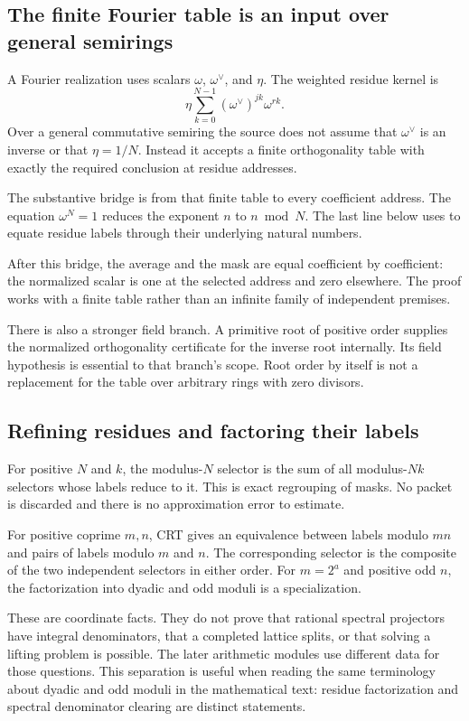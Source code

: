 \subsection{The finite Fourier table is an input over general semirings}

A Fourier realization uses scalars $\omega$, $\omega^\vee$, and $\eta$. The weighted residue kernel is
\[
\eta\sum_{k=0}^{N-1}(\omega^\vee)^{jk}\omega^{rk}.
\]
Over a general commutative semiring the source does not assume that $\omega^\vee$ is an inverse or that $\eta=1/N$. Instead it accepts a finite orthogonality table with exactly the required conclusion at residue addresses.

The substantive bridge is from that finite table to every coefficient address. The equation $\omega^N=1$ reduces the exponent $n$ to $n\bmod N$. The last line below uses  to equate residue labels through their underlying natural numbers.

After this bridge, the average and the mask are equal coefficient by coefficient: the normalized scalar is one at the selected address and zero elsewhere. The proof works with a finite table rather than an infinite family of independent premises.

There is also a stronger field branch. A primitive root of positive order supplies the normalized orthogonality certificate for the inverse root internally. Its field hypothesis is essential to that branch's scope. Root order by itself is not a replacement for the table over arbitrary rings with zero divisors.

\subsection{Refining residues and factoring their labels}

For positive $N$ and $k$, the modulus-$N$ selector is the sum of all modulus-$Nk$ selectors whose labels reduce to it. This is exact regrouping of masks. No packet is discarded and there is no approximation error to estimate.

For positive coprime $m,n$, CRT gives an equivalence between labels modulo $mn$ and pairs of labels modulo $m$ and $n$. The corresponding selector is the composite of the two independent selectors in either order. For $m=2^a$ and positive odd $n$, the factorization into dyadic and odd moduli is a specialization.

These are coordinate facts. They do not prove that rational spectral projectors have integral denominators, that a completed lattice splits, or that solving a lifting problem is possible. The later arithmetic modules use different data for those questions. This separation is useful when reading the same terminology about dyadic and odd moduli in the mathematical text: residue factorization and spectral denominator clearing are distinct statements.
